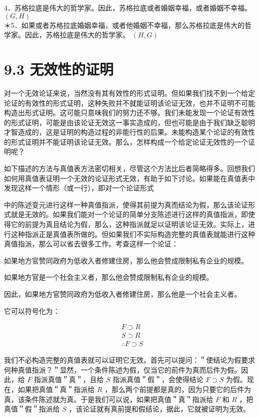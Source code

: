 4．苏格拉底是伟大的哲学家。因此，苏格拉底或者婚姻幸福，或者婚姻不幸福。 $(G, H)$\\
＊5．如果或者苏格拉底婚姻幸福，或者他婚姻不幸福，那么苏格拉底是伟大的哲学家。因此，苏格拉底是伟大的哲学家。 $(H, G)$

\section*{9.3 无效性的证明}
对一个无效论证来说，当然没有其有效性的形式证明。但如果我们找不到一个给定论证的有效性的形式证明，这种失败并不就能证明该论证无效，也并不证明不可能构造出形式证明。这可能只意味我们的努力还不够。我们未能发现一个论证有效性的形式证明，可能是由该论证无效这一事实造成的，但也可能是由于我们缺乏聪明才智造成的，这是证明的构造过程的非能行性的后果。未能构造某个论证的有效性的形式证明并不能证明该论证无效。那么，怎样构成一个给定论证无效性的一个证明呢？

如下描述的方法与真值表方法密切相关，尽管这个方法比后者简略得多。回想我们如何用真值表证明一个无效的论证形式无效，有助于如下讨论。如果能在真值表中发现这样一个情形（或一行），即对一个论证形式

中的陈述变元进行这样一种真值指派，使得其前提为真而结论为假，那么该论证形式就是无效的。如果我们能对一个论证的简单分支陈述进行这样的真值指派，即使得它的前提为真且结论为假，那么，这种指派就足以证明该论证无效。实际上，进行这种指派正是真值表所做的。但如果我们不实际构造完整的真值表就能进行这种真值指派，那么可以省去很多工作。考查这样一个论证：

如果地方官赞同政府为低收入者修建住房，那么他会赞成限制私有企业的规模。

如果地方官是一个社会主义者，那么他会赞成限制私有企业的规模。

因此，如果地方官赞同政府为低收入者修建住房，那么他是一个社会主义者。

它可以符号化为：

$$
\begin{aligned}
& F \supset R \\
& S \supset R \\
& \therefore F \supset S
\end{aligned}
$$

我们不必构造完整的真值表就可以证明它无效。首先可以提问：＂使结论为假要求何种真值指派？＂显然，一个条件陈述为假，仅当它的前件为真而后件为假。因此，给 $F$ 指派真值＂真＂，且给 $S$ 指派真值＂假＂，会使得结论 $F \supset S$ 为假。现在，如果把真值＂真＂指派给 $R$ ，那么两个前提都是真的，因为只要它的后件为真，该条件陈述就为真。于是我们可以说，如果把真值＂真＂指派给 $F$ 和 $R$ ，把真值＂假＂指派给 $S$ ，该论证就有真前提和假结论，据此，它就被证明为无效。

